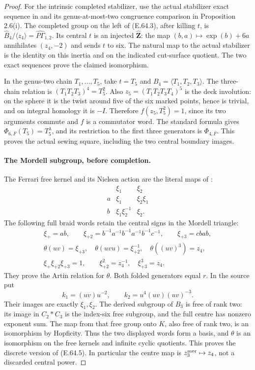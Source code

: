 \begin{proof}
For the intrinsic completed stabilizer, use the actual stabilizer
exact sequence in \cite[Theorem 2.3]{BCBoggi2026v6} and its
genus-at-most-two congruence comparison in Proposition 2.6(i).
The completed group on the left of (E.64.3), after killing $t$,
is $\widehat B_4/\langle z_4\rangle=
\widehat{P\Gamma}_{1,2}$.  Its central $t$ is an injected
$\widehat{\mathbf Z}$: the map
$(b,a)\mapsto\operatorname{exp}(b)+6a$ annihilates $(z_4,-2)$
and sends $t$ to six.  The natural map to the actual stabilizer
is the identity on this inertia and on the indicated cut-surface
quotient.  The two exact sequences prove the claimed isomorphism.

In the genus-two chain $T_1,\ldots,T_5$, take $t=T_5$ and
$B_4=\langle T_1,T_2,T_3\rangle$.  The three-chain relation is
$(T_1T_2T_3)^4=T_5^2$.  Also
$z_5=(T_1T_2T_3T_4)^5$ is the deck involution: on the sphere
it is the twist around five of the six marked points, hence is
trivial, and on integral homology it is $-I$.  Therefore
$f(z_5,T_5^2)=1$, since its two arguments commute and $f$ is a
commutator word.  The standard formula gives
$\Phi_{6,F}(T_5)=T_5^\lambda$, and its restriction to the first
three generators is $\Phi_{4,F}$.  This proves the actual
sewing square, including the two central boundary images.

\paragraph{The Mordell subgroup, before completion.}
The Ferrari free kernel and its Nielsen action are the literal
maps of \cite[(2.9), Lemma 4.6]{DE_NakamuraTsunogaiYasuda2010}:
\[
 \begin{array}{c|cc}
  &\xi_1&\xi_2\\ \hline
 a&\xi_1&\xi_2\xi_1\\
 b&\xi_1\xi_2^{-1}&\xi_2.
 \end{array}
 \tag{E.64.17}
\]
The following full braid words retain the central signs in the
Mordell triangle:
\[
 \begin{gathered}
 \xi_+=ab,\qquad
 \xi_{+2}=b^{-1}a^{-1}b^{-1}a^{-1}b^{-1}c^{-1},\qquad
 \xi_{+3}=cbab,\\
 \theta(uv)=\xi_{+3},\quad
 \theta(uvu)=\xi_{+2}^{-1},\quad
 \theta((uv)^3)=z_4,\\
 \xi_+\xi_{+2}\xi_{+3}=1,\qquad
 \xi_{+2}^2=z_4^{-1},\quad\xi_{+3}^3=z_4.
 \end{gathered}
 \tag{E.64.18}
\]
They prove the Artin relation for $\theta$.  Both folded
generators equal $r$.  In the source put
\[
 k_1=(uv)u^{-2},\qquad
 k_2=u^4(uv)(uv)^{-3}.
 \tag{E.64.19}
\]
Their images are exactly $\xi_1,\xi_2$.  The derived subgroup
of $B_3$ is free of rank two: its image in $C_2*C_3$ is the
index-six free subgroup, and the full centre has nonzero
exponent sum.  The map from that free group onto $K$, also
free of rank two, is an isomorphism by Hopficity.  Thus the two
displayed words form a basis, and $\theta$ is an isomorphism on
the free kernels and infinite cyclic quotients.  This proves
the discrete version of (E.64.5).  In particular the centre
map is $z_3^{\rm mor}\mapsto z_4$, not a discarded central power.


\end{proof}
